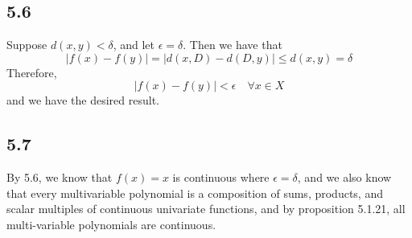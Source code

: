\documentclass[letterpaper,12pt]{article}
\theoremstyle{definition}
\begin{document}
\subsection*{5.6}


Suppose $d(x,y) < \delta$, and let $\epsilon = \delta$. Then we have that
\[|f(x) - f(y)| = |d(x,D) - d(D,y) | \leq d(x,y) = \delta\]
Therefore, \[ |f(x) - f(y)| < \epsilon \quad \forall x \in X\] and we have the desired result.

\subsection*{5.7}


By 5.6, we know that $f(x) = x$ is continuous where $\epsilon = \delta$, and we also know that every multivariable polynomial is a composition of sums, products, and scalar
multiples of continuous univariate functions, and by proposition 5.1.21, all multi-variable polynomials are continuous.
\end{document}
